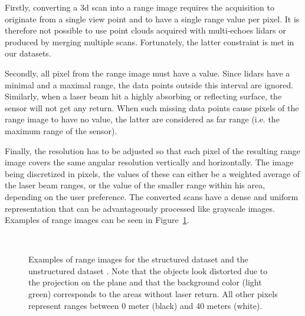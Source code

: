 Firstly, converting a \gls*{3d} scan into a range image requires the acquisition to originate from a single view point and to have a single range value per pixel. It is therefore not possible to use point clouds acquired with multi-echoes \gls*{lidar}s or produced by merging multiple scans. Fortunately, the latter constraint is met in our datasets.

Secondly, all pixel from the range image must have a value. Since \gls*{lidar}s have a minimal and a maximal range, the data points outside this interval are ignored. Similarly, when a laser beam hit a highly absorbing or reflecting surface, the sensor will not get any return. When such missing data points cause pixels of the range image to have no value, the latter are considered as far range (i.e. the maximum range of the sensor).

Finally, the resolution has to be adjusted so that each pixel of the resulting range image covers the same angular resolution vertically and horizontally. The image being discretized in pixels, the values of these can either be a weighted average of the laser beam ranges, or the value of the smaller range within his area, depending on the user preference. The converted scans have a dense and uniform representation that can be advantageously processed like grayscale images. Examples of range images can be seen in Figure~\ref{fig:chap_slam_range}.

\begin{figure}[H]
    \centering
    \\
    \caption{Examples of range images for the structured dataset \protect{} and the unstructured dataset \protect{}. Note that the objects look distorted due to the projection on the plane and that the background color (light green) corresponds to the areas without laser return. All other pixels represent ranges between 0 meter (black) and 40 meters (white).}
    \label{fig:chap_slam_range}
\end{figure}


